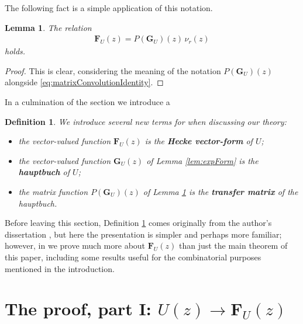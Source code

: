 \documentclass[11pt]{article}
\newtheorem{defin}{Definition}
\newtheorem{lem}{Lemma}
\begin{document}
The following fact is a simple application of this notation.

    \begin{lem}\label{lem:VectorFormEquivalence}
        The relation
            \begin{eqnarray*}
                \mathbf{F}_{U}(z) = P(\mathbf{G}_U)(z)\,\nu_r(z)
            \end{eqnarray*}
        holds. 
    \end{lem}
    \begin{proof}
        This is clear, considering the meaning of the notation  $ P(\mathbf{G}_U)(z) $ alongside \eqref{eq:matrixConvolutionIdentity}.
    \end{proof}

In a culmination of the section we introduce a
    \begin{defin}\label{def:HeckeVectorForm}
        We introduce several new terms for when discussing our theory:
            \begin{itemize}
                \item the vector-valued function $ \mathbf{F}_U\left(z \right) $ is the \textbf{Hecke vector-form} of $ U $; 
                \item the vector-valued function $ \mathbf{G}_U(z) $ of Lemma \ref{lem:expForm} is the \textbf{hauptbuch} of $U$; 
                \item the matrix function $ P(\mathbf{G}_U)(z) $ of Lemma \ref{lem:VectorFormEquivalence} is the \textbf{transfer matrix } of the hauptbuch. 
            \end{itemize}
    \end{defin}

    
Before leaving this section, Definition \ref{def:HeckeVectorForm} comes originally from the author's dissertation \cite{henry2025}, but here the presentation is simpler and perhaps more familiar; however, in \cite{henry2025} we prove much more about $ \mathbf{F}_U(z) $ than just the main theorem of this paper, including some results useful for the combinatorial purposes mentioned in the introduction.



\section{The proof, part I: $ U(z) \rightarrow \mathbf{F}_U(z)$}
\end{document}
